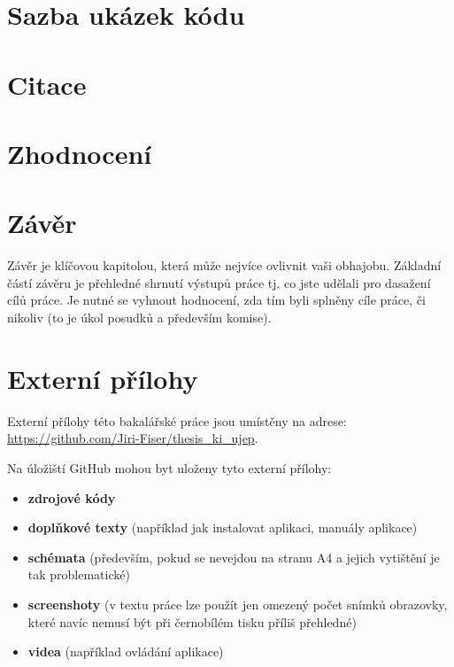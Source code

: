 \documentclass[male,czech]{kitheses}
\begin{document}
\chapter{Sazba ukázek kódu}

\chapter{Citace}

\chapter{Zhodnocení} 

\chapter{Závěr}

Závěr je klíčovou kapitolou, která může nejvíce ovlivnit vaši obhajobu. Základní částí závěru je přehledné shrnutí výstupů práce tj. co jste udělali pro dasažení cílů práce. Je nutné se vyhnout hodnocení, zda tím byli splněny cíle práce, či nikoliv (to je úkol posudků a především komise).

\printbibliography[title=Seznam použitých zdrojů]

\appendix

\chapter{Externí přílohy\label{sec:ep}}

Externí přílohy této bakalářské práce jsou umístěny na adrese:\\ \url{https://github.com/Jiri-Fiser/thesis_ki_ujep}.

Na úložiští GitHub mohou byt uloženy tyto externí přílohy:

\begin{itemize}
\item \textbf{zdrojové kódy}
\item \textbf{doplňkové texty} (například jak instalovat aplikaci, manuály aplikace)
\item \textbf{schémata} (především, pokud se nevejdou na stranu A4 a jejich vytištění je tak problematické)
\item \textbf{screenshoty} (v textu práce lze použít jen omezený počet snímků obrazovky, které navíc nemusí být při černobílém tisku příliš přehledné)
\item \textbf{videa} (například ovládání aplikace)
\end{itemize}
\end{document}
